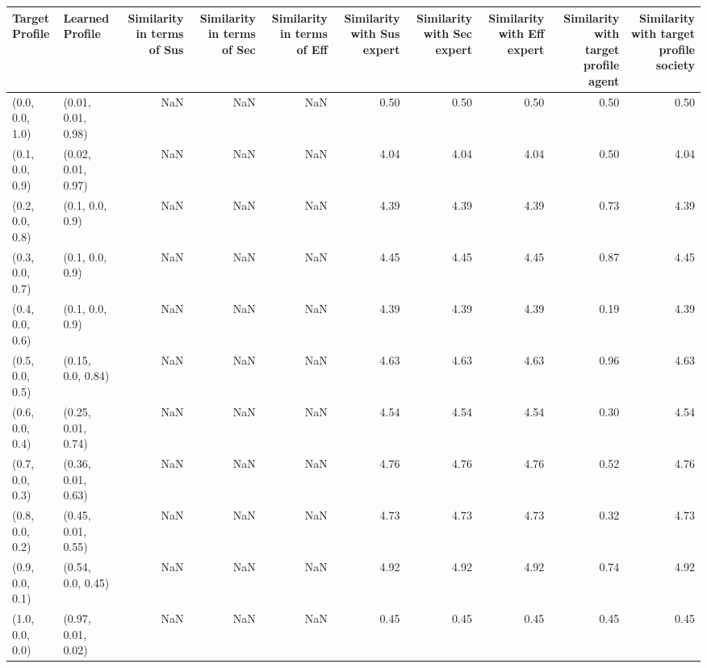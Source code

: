 \begin{tabular}{llrrrrrrrr}
\toprule
Target Profile & Learned Profile & Similarity in terms of Sus & Similarity in terms of Sec & Similarity in terms of Eff & Similarity with Sus expert & Similarity with Sec expert & Similarity with Eff expert & Similarity with target profile agent & Similarity with target profile society \\
\midrule
(0.0, 0.0, 1.0) & (0.01, 0.01, 0.98) & NaN & NaN & NaN & 0.50 & 0.50 & 0.50 & 0.50 & 0.50 \\
(0.1, 0.0, 0.9) & (0.02, 0.01, 0.97) & NaN & NaN & NaN & 4.04 & 4.04 & 4.04 & 0.50 & 4.04 \\
(0.2, 0.0, 0.8) & (0.1, 0.0, 0.9) & NaN & NaN & NaN & 4.39 & 4.39 & 4.39 & 0.73 & 4.39 \\
(0.3, 0.0, 0.7) & (0.1, 0.0, 0.9) & NaN & NaN & NaN & 4.45 & 4.45 & 4.45 & 0.87 & 4.45 \\
(0.4, 0.0, 0.6) & (0.1, 0.0, 0.9) & NaN & NaN & NaN & 4.39 & 4.39 & 4.39 & 0.19 & 4.39 \\
(0.5, 0.0, 0.5) & (0.15, 0.0, 0.84) & NaN & NaN & NaN & 4.63 & 4.63 & 4.63 & 0.96 & 4.63 \\
(0.6, 0.0, 0.4) & (0.25, 0.01, 0.74) & NaN & NaN & NaN & 4.54 & 4.54 & 4.54 & 0.30 & 4.54 \\
(0.7, 0.0, 0.3) & (0.36, 0.01, 0.63) & NaN & NaN & NaN & 4.76 & 4.76 & 4.76 & 0.52 & 4.76 \\
(0.8, 0.0, 0.2) & (0.45, 0.01, 0.55) & NaN & NaN & NaN & 4.73 & 4.73 & 4.73 & 0.32 & 4.73 \\
(0.9, 0.0, 0.1) & (0.54, 0.0, 0.45) & NaN & NaN & NaN & 4.92 & 4.92 & 4.92 & 0.74 & 4.92 \\
(1.0, 0.0, 0.0) & (0.97, 0.01, 0.02) & NaN & NaN & NaN & 0.45 & 0.45 & 0.45 & 0.45 & 0.45 \\
\bottomrule
\end{tabular}
